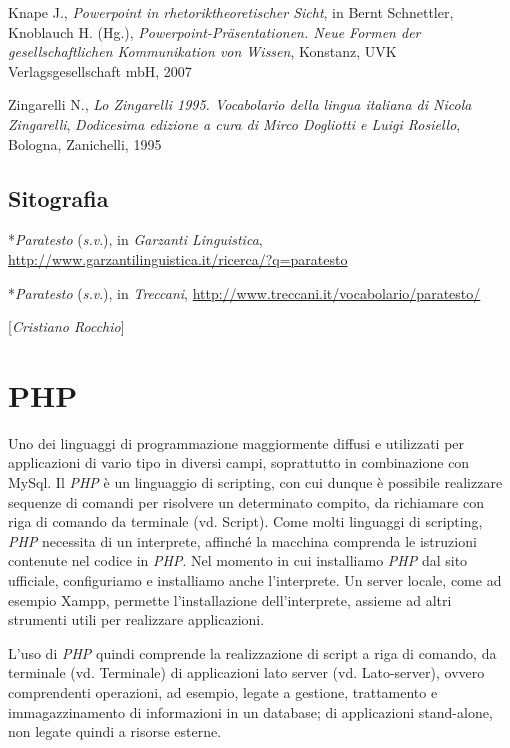{{Knape J., \emph{Powerpoint in rhetoriktheoretischer Sicht}, in Bernt
Schnettler, Knoblauch H. (Hg.), \emph{Powerpoint-Präsentationen. Neue
Formen der gesellschaftlichen Kommunikation von Wissen}, Konstanz, UVK
Verlagsgesellschaft mbH, 2007

Zingarelli N., \emph{Lo Zingarelli 1995. Vocabolario della lingua
italiana di Nicola Zingarelli}, \emph{Dodicesima edizione a cura di
Mirco Dogliotti e Luigi Rosiello}, Bologna, Zanichelli, 1995
}

\section*{Sitografia}
{\parindent0pt 
*\emph{Paratesto} (\emph{s.v}.), in \emph{Garzanti Linguistica},
\url{http://www.garzantilinguistica.it/ricerca/?q=paratesto}

*\emph{Paratesto} (\emph{s.v}.), in \emph{Treccani},
\url{http://www.treccani.it/vocabolario/paratesto/}
}

\hrulefill 

{[}\emph{Cristiano Rocchio}{]}




\chapter{PHP}

Uno dei linguaggi di programmazione maggiormente diffusi e utilizzati
per applicazioni di vario tipo in diversi campi, soprattutto in
combinazione con MySql. Il \emph{PHP} è un linguaggio di scripting, con
cui dunque è possibile realizzare sequenze di comandi per risolvere un
determinato compito, da richiamare con riga di comando da terminale (vd.
Script). Come molti linguaggi di scripting, \emph{PHP} necessita di un
interprete, affinché la macchina comprenda le istruzioni contenute nel
codice in \emph{PHP}. Nel momento in cui installiamo \emph{PHP} dal sito
ufficiale, configuriamo e installiamo anche l'interprete. Un server
locale, come ad esempio Xampp, permette l'installazione dell'interprete,
assieme ad altri strumenti utili per realizzare applicazioni.

L'uso di \emph{PHP} quindi comprende la realizzazione di script a riga
di comando, da terminale (vd. Terminale) di applicazioni lato server
(vd. Lato-server), ovvero comprendenti operazioni, ad esempio, legate a
gestione, trattamento e immagazzinamento di informazioni in un database;
di applicazioni stand-alone, non legate quindi a risorse esterne.

}
